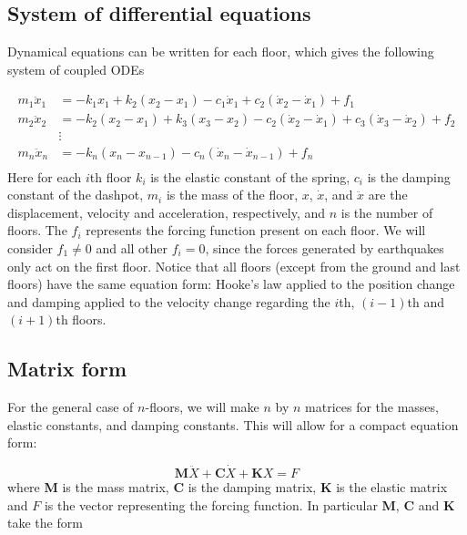 \documentclass{article}
\begin{document}
		\subsection{System of differential equations}

			Dynamical equations can be written for each floor, which gives the following system of coupled ODEs
				
				\begin{align*}
					m_1\ddot{x}_1&= -k_1x_1 + k_2(x_2-x_1) - c_1\dot{x}_1 + c_2(\dot{x}_2-\dot{x}_1) + f_1\\
					m_2\ddot{x}_2&= -k_2(x_2-x_1) + k_3(x_3-x_2) -c_2(\dot{x}_2-\dot{x}_1) + c_3(\dot{x}_3-\dot{x}_2) + f_2\\
					&\vdots\\
					m_n\ddot{x}_n&= -k_n(x_n-x_{n-1}) - c_n(\dot{x}_n-\dot{x}_{n-1})+ f_n\\
				\end{align*}
Here for each $i$th floor $k_i$ is the elastic constant of the spring,  $c_i$ is the damping constant of the dashpot, $m_i$ is the mass of the floor, $x$, $\dot{x}$, and $\ddot{x}$ are the displacement, velocity and acceleration, respectively, and $n$ is the number of floors. The $f_i$ represents the forcing function present on each floor. We will consider $f_1 \neq 0$ and all other $f_i = 0$, since the forces generated by earthquakes only act on the first floor. Notice that all floors (except from the ground and last floors) have the same equation form: Hooke's law applied to the position change and damping applied to the velocity change regarding the $i$th, $(i-1)$th and $(i+1)$th floors. 

		\subsection{Matrix form}	

			For the general case of $n$-floors, we will make $n$ by $n$ matrices for the masses, elastic constants, and damping constants. This will allow for a compact equation form:

				\begin{equation}
					\textbf{M}\ddot{X}+\textbf{C}\dot{X}+\textbf{K}X = F
				\end{equation}
where \textbf{M} is the mass matrix, \textbf{C} is the damping matrix, \textbf{K} is the elastic matrix and $F$ is the vector representing the forcing function. In particular \textbf{M}, \textbf{C} and \textbf{K} take the form
\end{document}
